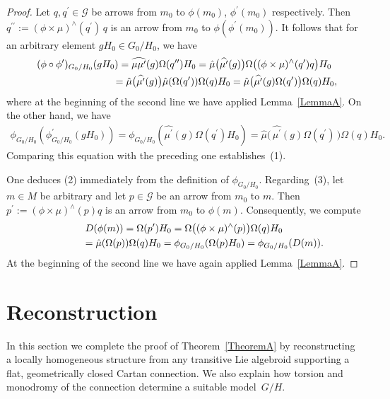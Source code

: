 \documentclass[pdftex]{sigma}
\numberwithin{equation}{section}
\begin{document}
\begin{proof}
  Let $q,q^\prime \in {\mathcal G} $ be arrows from $m_0$ to
  $\phi(m_0)$, $\phi^\prime(m_0)$ respectively. Then
  $q^{\prime\prime}:=(\phi \times \mu)^\wedge(q^\prime)\,q$ is an
  arrow from $m_0$ to $\phi(\phi^\prime(m_0))$. It follows that for an
  arbitrary element $gH_0\in {G_0/H_0}$, we have
  \begin{gather*}
    (\phi \circ  \phi^\prime)_{G_0/H_0}(gH_0)=\widehat{\mu \mu^\prime}(g)\Omega(q^{\prime\prime})H_0=\hat\mu\big(\widehat{\mu^\prime}(g)\big)\Omega\big( (\phi \times \mu)^\wedge(q^\prime)q \big)H_0\\
    \hphantom{(\phi \circ  \phi^\prime)_{G_0/H_0}(gH_0)}{}
=\hat\mu\big(\widehat{\mu^\prime}(g)\big)\hat\mu(\Omega(q^\prime))\Omega(q)H_0=
\hat\mu \big( \widehat{\mu^\prime}(g)\Omega(q^\prime) \big)\Omega(q)H_0,
  \end{gather*}
  where at the beginning of the second line we have applied Lemma~\ref{LemmaA}. On the other hand, we have
  \begin{gather*}
    \phi_{G_0/H_0}(\phi^\prime_{G_0/H_0}(gH_0))=
     \phi_{G_0/H_0}(\widehat{\mu^\prime}(g)\Omega(q^\prime)H_0)=\hat\mu \Big(\,\widehat{\mu^\prime}(g)\Omega(q^\prime)\,\Big)\Omega(q)H_0.
   \end{gather*}
   Comparing this equation with the preceding one establishes~(1).

   One deduces (2) %
   immediately from the def\/inition of
   $\phi_{G_0/H_0} $. Regarding~(3), %
   let $m \in M$ be
   arbitrary and let $p \in {\mathcal G} $ be an arrow from $m_0$ to
   $m$. Then $p^\prime := (\phi \times \mu)^\wedge(p) q$ is an arrow
   from $m_0$ to $\phi(m)$. Consequently, we compute
\begin{gather*}
  D(\phi(m))=\Omega(p^\prime)H_0=\Omega \big( (\phi \times
  \mu)^\wedge(p) \big)\Omega(q)H_0\\
\hphantom{D(\phi(m))}{}  =\hat\mu(\Omega(p))\Omega(q)H_0
  =\phi_{G_0/H_0}(\Omega(p)H_0)=\phi_{G_0/H_0}(D(m)).
\end{gather*}
At the beginning of the second line we have again applied Lemma~\ref{LemmaA}.
\end{proof}

\section{Reconstruction}\label{main}

In this section we complete the proof of Theorem~\ref{TheoremA} by reconstructing a
locally homogeneous structure from any transitive Lie algebroid
supporting a f\/lat, geometrically closed Cartan connection. We also
explain how torsion and monodromy of the connection determine a
suitable model~$G/H$.
\end{document}
